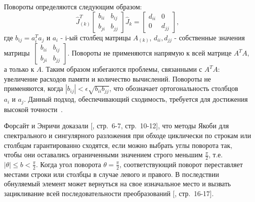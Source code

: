  Повороты определяются следующим образом: 
 \begin{equation} \label{one-sided Jacobi}
 \hat{J}^T_{(k)}\begin{bmatrix}
     b_{ii}&b_{ij}\\
     b_{ji}&b_{jj}
 \end{bmatrix}
 \hat{J}_{k} = \begin{bmatrix}
     d_{ii}&0\\
     0&d_{jj}
 \end{bmatrix},
 \end{equation}
 где $b_{ij} = a^T_ia_j$ и $a_i$ - i-ый столбец матрицы $A_{(k)}$, $d_{ii}, d_{jj}$ - собственные значения матрицы~$\begin{bmatrix}
      b_{ii}&b_{ij}\\
     b_{ji}&b_{jj}
 \end{bmatrix}$. 
Повороты не применяются напрямую к всей матрице $A^TA$, а только к $A$. Таким образом избегаются проблемы, связанными с $A^TA$: увеличение расходов памяти и количество вычислений. Повороты не применяются, когда $|b_{ij}| < \epsilon\sqrt{b_{ii}b_{jj}}$, что обозначает ортогональность столбцов $a_i\text{ и } a_j$.
Данный подход, обеспечивающий сходимость, требуется для достижения высокой точности~\cite{Dongarra2018}.

Форсайт и Энричи доказали [, стр.~6-7, стр.~10-12], что методы Якоби для спектрального и сингулярного разложения при обходе циклически по строкам или столбцам гарантированно сходятся, если можно выбрать углы поворота так, чтобы они оставались ограниченными значением строго меньшим $\frac{\pi}{2}$, т.е. $\left|\theta\right| \le b <\frac{\pi}{2}$. Когда угол поворота $\theta = \frac{\pi}{2}$, соответствующий поворот переставляет местами строки или столбцы в случае левого и правого. В последствии обнуляемый элемент может вернуться на свое изначальное место и вызвать зацикливание всей последовательности преобразований [, стр.~16-17].


